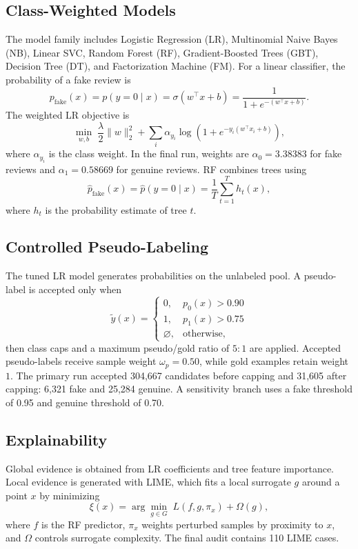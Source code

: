 \documentclass[conference]{IEEEtran}
\begin{document}
\subsection{Class-Weighted Models}
The model family includes Logistic Regression (LR), Multinomial Naive Bayes (NB), Linear SVC, Random Forest (RF), Gradient-Boosted Trees (GBT), Decision Tree (DT), and Factorization Machine (FM). For a linear classifier, the probability of a fake review is
\begin{equation}
p_{\mathrm{fake}}(x)=p(y=0\mid x)=\sigma(w^\top x+b)=\frac{1}{1+e^{-(w^\top x+b)}}.
\label{eq:logistic}
\end{equation}
The weighted LR objective is
\begin{equation}
\min_{w,b}\;\frac{\lambda}{2}\lVert w\rVert_2^2+\sum_i \alpha_{y_i}\log\left(1+e^{-y_i(w^\top x_i+b)}\right),
\label{eq:lr_loss}
\end{equation}
where $\alpha_{y_i}$ is the class weight. In the final run, weights are $\alpha_0=3.38383$ for fake reviews and $\alpha_1=0.58669$ for genuine reviews. RF combines trees using
\begin{equation}
\hat{p}_{\mathrm{fake}}(x)=\hat{p}(y=0\mid x)=\frac{1}{T}\sum_{t=1}^{T}h_t(x),
\label{eq:rf}
\end{equation}
where $h_t$ is the probability estimate of tree $t$.

\subsection{Controlled Pseudo-Labeling}
The tuned LR model generates probabilities on the unlabeled pool. A pseudo-label is accepted only when
\begin{equation}
\tilde{y}(x)=\begin{cases}0,&p_0(x)>0.90\\1,&p_1(x)>0.75\\\varnothing,&\text{otherwise},\end{cases}
\label{eq:pseudo}
\end{equation}
then class caps and a maximum pseudo/gold ratio of $5{:}1$ are applied. Accepted pseudo-labels receive sample weight $\omega_p=0.50$, while gold examples retain weight $1$. The primary run accepted 304,667 candidates before capping and 31,605 after capping: 6,321 fake and 25,284 genuine. A sensitivity branch uses a fake threshold of 0.95 and genuine threshold of 0.70.

\subsection{Explainability}
Global evidence is obtained from LR coefficients and tree feature importance. Local evidence is generated with LIME, which fits a local surrogate $g$ around a point $x$ by minimizing
\begin{equation}
\xi(x)=\arg\min_{g\in G}\;L(f,g,\pi_x)+\Omega(g),
\label{eq:lime}
\end{equation}
where $f$ is the RF predictor, $\pi_x$ weights perturbed samples by proximity to $x$, and $\Omega$ controls surrogate complexity. The final audit contains 110 LIME cases.
\end{document}
